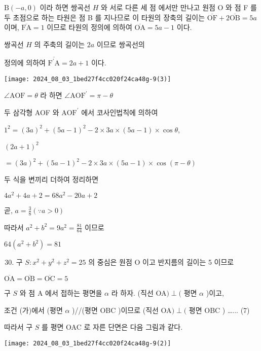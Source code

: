 \documentclass[10pt]{article}
\begin{document}
\(\mathrm{B}(-a, 0)\) 이라 하면 쌍곡선 \(H\) 와 서로 다른 세 점 에서만 만나고 원점 O 와 점 F 를 두 초점으로 하는 타원은 점 B 를 지나므로 이 타원의 장축의 길이는 \(\overline{\mathrm{OF}}+2 \overline{\mathrm{OB}}=5 a\) 이며, \(\overline{\mathrm{FA}}=1\) 이므로 타원의 정의에 의하여 \(\overline{\mathrm{OA}}=5 a-1\) 이다.

쌍곡선 \(H\) 의 주축의 길이는 \(2 a\) 이므로 쌍곡선의

정의에 의하여 \(\overline{\mathrm{F}^{\prime} \mathrm{A}}=2 a+1\) 이다.

\begin{center}
\texttt{[image: 2024\_08\_03\_1bed27f4cc020f24ca48g-9(3)]}
\end{center}

\(\angle \mathrm{AOF}=\theta\) 라 하면 \(\angle \mathrm{AOF}^{\prime}=\pi-\theta\)

두 삼각형 AOF 와 \(\mathrm{AOF}^{\prime}\) 에서 코사인법칙에 의하여

\(1^{2}=(3 a)^{2}+(5 a-1)^{2}-2 \times 3 a \times(5 a-1) \times \cos \theta\),

\((2 a+1)^{2}\)

\(=(3 a)^{2}+(5 a-1)^{2}-2 \times 3 a \times(5 a-1) \times \cos (\pi-\theta)\)

두 식을 변끼리 더하여 정리하면

\(4 a^{2}+4 a+2=68 a^{2}-20 a+2\)

곧, \(a=\frac{3}{8}(\because a>0)\)

따라서 \(a^{2}+b^{2}=9 a^{2}=\frac{81}{64}\) 이므로

\(64\left(a^{2}+b^{2}\right)=81\)

\begin{enumerate}
  \setcounter{enumi}{29}
  \item 구 \(S: x^{2}+y^{2}+z^{2}=25\) 의 중심은 원점 O 이고 반지름의 길이는 5 이므로
\end{enumerate}

\(\overline{\mathrm{OA}}=\overline{\mathrm{OB}}=\overline{\mathrm{OC}}=5\)

구 \(S\) 와 점 A 에서 접하는 평면을 \(\alpha\) 라 하자. (직선 OA\() \perp(\) 평면 \(\alpha\) )이고,

조건 (가)에서 (평면 \(\alpha\) )//(평면 OBC )이므로 (직선 OA\() \perp(\) 평면 OBC ) …... (7)

따라서 구 \(S\) 를 평면 OAC 로 자른 단면은 다음 그림과 같다.

\begin{center}
\texttt{[image: 2024\_08\_03\_1bed27f4cc020f24ca48g-9(2)]}
\end{center}
\end{document}

